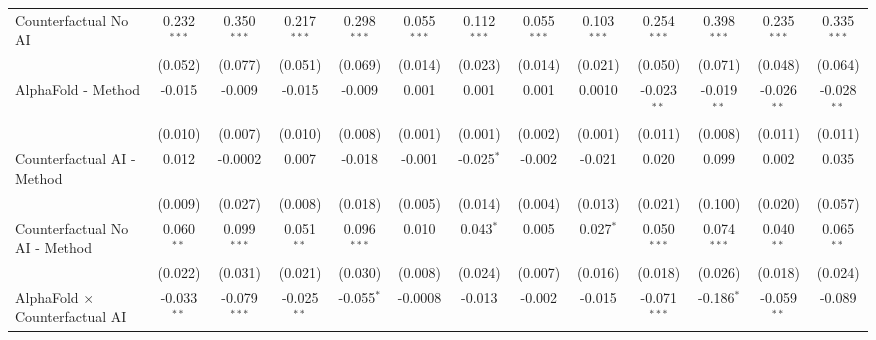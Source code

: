 \begin{tabular}{lcccccccccccc}
   Counterfactual No AI                                       & 0.232$^{***}$ & 0.350$^{***}$  & 0.217$^{***}$ & 0.298$^{***}$  & 0.055$^{***}$ & 0.112$^{***}$  & 0.055$^{***}$ & 0.103$^{***}$  & 0.254$^{***}$  & 0.398$^{***}$  & 0.235$^{***}$ & 0.335$^{***}$\\   
                                                              & (0.052)       & (0.077)        & (0.051)       & (0.069)        & (0.014)       & (0.023)        & (0.014)       & (0.021)        & (0.050)        & (0.071)        & (0.048)       & (0.064)\\   
   AlphaFold - Method                                         & -0.015        & -0.009         & -0.015        & -0.009         & 0.001         & 0.001          & 0.001         & 0.0010         & -0.023$^{**}$  & -0.019$^{**}$  & -0.026$^{**}$ & -0.028$^{**}$\\   
                                                              & (0.010)       & (0.007)        & (0.010)       & (0.008)        & (0.001)       & (0.001)        & (0.002)       & (0.001)        & (0.011)        & (0.008)        & (0.011)       & (0.011)\\   
   Counterfactual AI - Method                                 & 0.012         & -0.0002        & 0.007         & -0.018         & -0.001        & -0.025$^{*}$   & -0.002        & -0.021         & 0.020          & 0.099          & 0.002         & 0.035\\   
                                                              & (0.009)       & (0.027)        & (0.008)       & (0.018)        & (0.005)       & (0.014)        & (0.004)       & (0.013)        & (0.021)        & (0.100)        & (0.020)       & (0.057)\\   
   Counterfactual No AI - Method                              & 0.060$^{**}$  & 0.099$^{***}$  & 0.051$^{**}$  & 0.096$^{***}$  & 0.010         & 0.043$^{*}$    & 0.005         & 0.027$^{*}$    & 0.050$^{***}$  & 0.074$^{***}$  & 0.040$^{**}$  & 0.065$^{**}$\\   
                                                              & (0.022)       & (0.031)        & (0.021)       & (0.030)        & (0.008)       & (0.024)        & (0.007)       & (0.016)        & (0.018)        & (0.026)        & (0.018)       & (0.024)\\   
   AlphaFold $\times$ Counterfactual AI                       & -0.033$^{**}$ & -0.079$^{***}$ & -0.025$^{**}$ & -0.055$^{*}$   & -0.0008       & -0.013         & -0.002        & -0.015         & -0.071$^{***}$ & -0.186$^{*}$   & -0.059$^{**}$ & -0.089\\   

\end{tabular}
